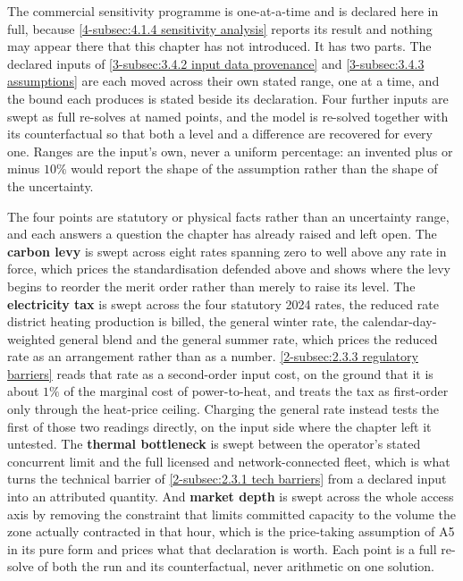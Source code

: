 The commercial sensitivity programme is one-at-a-time and is declared here in full, because \autoref{4-subsec:4.1.4 sensitivity analysis} reports its result and nothing may appear there that this chapter has not introduced. It has two parts. The declared inputs of \autoref{3-subsec:3.4.2 input data provenance} and \autoref{3-subsec:3.4.3 assumptions} are each moved across their own stated range, one at a time, and the bound each produces is stated beside its declaration. Four further inputs are swept as full re-solves at named points, and the model is re-solved together with its counterfactual so that both a level and a difference are recovered for every one. Ranges are the input's own, never a uniform percentage: an invented plus or minus $10\%$ would report the shape of the assumption rather than the shape of the uncertainty.

The four points are statutory or physical facts rather than an uncertainty range, and each answers a question the chapter has already raised and left open. The \textbf{carbon levy} is swept across eight rates spanning zero to well above any rate in force, which prices the standardisation defended above and shows where the levy begins to reorder the merit order rather than merely to raise its level. The \textbf{electricity tax} is swept across the four statutory 2024 rates, the reduced rate district heating production is billed, the general winter rate, the calendar-day-weighted general blend and the general summer rate, which prices the reduced rate as an arrangement rather than as a number. \autoref{2-subsec:2.3.3 regulatory barriers} reads that rate as a second-order input cost, on the ground that it is about $1\%$ of the marginal cost of power-to-heat, and treats the tax as first-order only through the heat-price ceiling. Charging the general rate instead tests the first of those two readings directly, on the input side where the chapter left it untested. The \textbf{thermal bottleneck} is swept between the operator's stated concurrent limit and the full licensed and network-connected fleet, which is what turns the technical barrier of \autoref{2-subsec:2.3.1 tech barriers} from a declared input into an attributed quantity. And \textbf{market depth} is swept across the whole access axis by removing the constraint that limits committed capacity to the volume the zone actually contracted in that hour, which is the price-taking assumption of A5 in its pure form and prices what that declaration is worth. Each point is a full re-solve of both the run and its counterfactual, never arithmetic on one solution.

